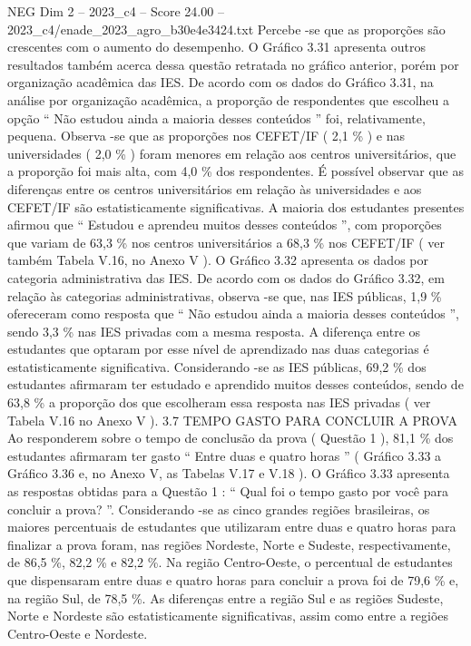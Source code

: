 \begin{textsample}{NEG Dim 2 – 2023\_c4 – Score 24.00 – 2023\_c4/enade\_2023\_agro\_b30e4e3424.txt}
Percebe -se que as proporções são crescentes com o aumento do desempenho.
O Gráfico 3.31 apresenta outros resultados também acerca dessa questão retratada no gráfico anterior, porém por organização acadêmica das IES.
De acordo com os dados do Gráfico 3.31, na análise por organização acadêmica, a proporção de respondentes que escolheu a opção “ Não estudou ainda a maioria desses conteúdos ” foi, relativamente, pequena.
Observa -se que as proporções nos CEFET/IF ( 2,1 \% ) e nas universidades ( 2,0 \% ) foram menores em relação aos centros universitários, que a proporção foi mais alta, com 4,0 \% dos respondentes.
É possível observar que as diferenças entre os centros universitários em relação às universidades e aos CEFET/IF são estatisticamente significativas.
A maioria dos estudantes presentes afirmou que “ Estudou e aprendeu muitos desses conteúdos ”, com proporções que variam de 63,3 \% nos centros universitários a 68,3 \% nos CEFET/IF ( ver também Tabela V.16, no Anexo V ).
O Gráfico 3.32 apresenta os dados por categoria administrativa das IES.
De acordo com os dados do Gráfico 3.32, em relação às categorias administrativas, observa -se que, nas IES públicas, 1,9 \% ofereceram como resposta que “ Não estudou ainda a maioria desses conteúdos ”, sendo 3,3 \% nas IES privadas com a mesma resposta.
A diferença entre os estudantes que optaram por esse nível de aprendizado nas duas categorias é estatisticamente significativa.
Considerando -se as IES públicas, 69,2 \% dos estudantes afirmaram ter estudado e aprendido muitos desses conteúdos, sendo de 63,8 \% a proporção dos que escolheram essa resposta nas IES privadas ( ver Tabela V.16 no Anexo V ). 3.7 TEMPO GASTO PARA CONCLUIR A PROVA Ao responderem sobre o tempo de conclusão da prova ( Questão 1 ), 81,1 \% dos estudantes afirmaram ter gasto “ Entre duas e quatro horas ” ( Gráfico 3.33 a Gráfico 3.36 e, no Anexo V, as Tabelas V.17 e V.18 ).
O Gráfico 3.33 apresenta as respostas obtidas para a Questão 1 : “ Qual foi o tempo gasto por você para concluir a prova? ”.
Considerando -se as cinco grandes regiões brasileiras, os maiores percentuais de estudantes que utilizaram entre duas e quatro horas para finalizar a prova foram, nas regiões Nordeste, Norte e Sudeste, respectivamente, de 86,5 \%, 82,2 \% e 82,2 \%.
Na região Centro-Oeste, o percentual de estudantes que dispensaram entre duas e quatro horas para concluir a prova foi de 79,6 \% e, na região Sul, de 78,5 \%.
As diferenças entre a região Sul e as regiões Sudeste, Norte e Nordeste são estatisticamente significativas, assim como entre a regiões Centro-Oeste e Nordeste.

\end{textsample}
